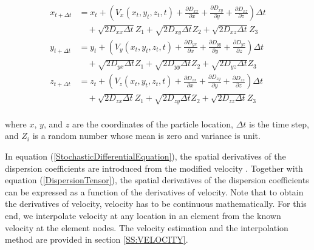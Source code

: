 \begin{equation}\label{StochasticDifferentialEquation}
\begin{array}{llllll}
x _{t+\Delta t} & =x _{t}+ \left(V _x(x _t,y _t,z _t,t) + \frac{\partial D _{xx}}{\partial x} + \frac{\partial D _{xy}}{\partial y} + \frac{\partial D _{xz}}{\partial z} \right ) \Delta t \\
&\quad + \sqrt{2D _{xx} \Delta t }Z _1 + \sqrt{2D _{xy} \Delta t }Z _2 + \sqrt{2D _{xz} \Delta t }Z _3 \\
y _{t+\Delta t} & =y _{t}+ \left(V _y(x _t,y _t,z _t,t) + \frac{\partial D _{yx}}{\partial x} + \frac{\partial D _{yy}}{\partial y} + \frac{\partial D _{yz}}{\partial z} \right ) \Delta t \\
&\quad + \sqrt{2D _{yx} \Delta t }Z _1 + \sqrt{2D _{yy} \Delta t }Z _2 + \sqrt{2D _{yz} \Delta t }Z _3 \\
z _{t+\Delta t} & =z _{t}+ \left(V _z(x _t,y _t,z _t,t) + \frac{\partial D _{zx}}{\partial x} + \frac{\partial D _{zy}}{\partial y} + \frac{\partial D _{zz}}{\partial z} \right ) \Delta t \\
&\quad + \sqrt{2D _{zx} \Delta t }Z _1 + \sqrt{2D _{zy} \Delta t }Z _2 + \sqrt{2D _{zz} \Delta t }Z _3 \\
\end{array}
\end{equation}

where $x$, $y$, and $z$ are the coordinates of the particle location, $\Delta t$ is the time step, and $Z _i$ is a random number whose mean is zero and variance is unit.

In equation (\ref{StochasticDifferentialEquation}), the spatial derivatives of the dispersion coefficients are introduced from the modified velocity \cite{wK86}. Together with equation (\ref{DispersionTensor}), the spatial derivatives of the dispersion coefficients can be expressed as a function of the derivatives of velocity. Note that to obtain the derivatives of velocity, velocity has to be continuous mathematically. For this end, we interpolate velocity at any location in an element from the known velocity at the element nodes. The velocity estimation and the interpolation method are provided in section \ref{SS:VELOCITY}.


